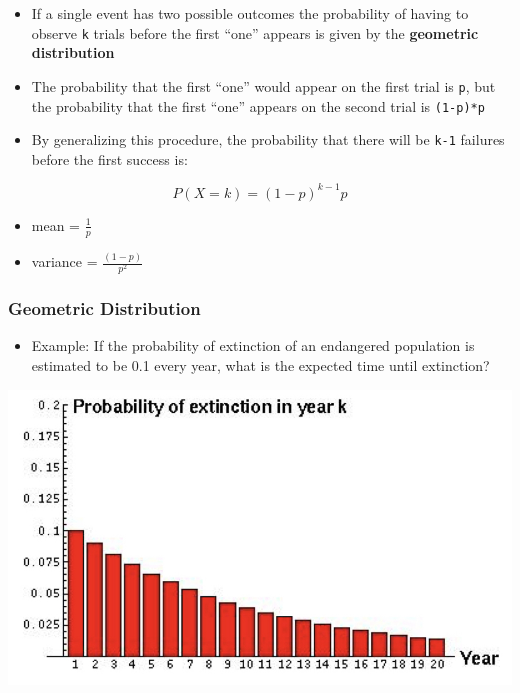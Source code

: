 \documentclass[]{book}
\providecommand{\tightlist}{%
  \setlength{\itemsep}{0pt}\setlength{\parskip}{0pt}}
\begin{document}
\begin{itemize}
\tightlist
\item
  If a single event has two possible outcomes the probability of having to observe \texttt{k} trials before the first ``one'' appears is given by the \textbf{geometric distribution}
\item
  The probability that the first ``one'' would appear on the first trial is \texttt{p}, but the probability that the first ``one'' appears on the second trial is \texttt{(1-p)*p}
\item
  By generalizing this procedure, the probability that there will be \texttt{k-1} failures before the first success is:
\end{itemize}

\[P(X=k)=(1-p)^{k-1}p\]

\begin{itemize}
\tightlist
\item
  mean = \(\frac{1}{p}\)
\item
  variance = \(\frac{(1-p)}{p^2}\)
\end{itemize}

\hypertarget{geometric-distribution-1}{%
\subsubsection{\texorpdfstring{\textbf{Geometric Distribution}}{Geometric Distribution}}\label{geometric-distribution-1}}

\begin{itemize}
\tightlist
\item
  Example: If the probability of extinction of an endangered population is estimated to be 0.1 every year, what is the expected time until extinction?
\end{itemize}

\begin{center}\includegraphics[width=0.8\linewidth]{images/prob.017} \end{center}
\end{document}
